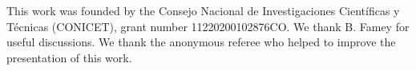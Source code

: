 \documentclass[twocolumn,twocolappendix,linenumbers]{aastex631}
\begin{document}
  










\begin{acknowledgments}
    This work was founded by the Consejo Nacional de Investigaciones Científicas y Técnicas (CONICET), grant number 11220200102876CO. We thank B. Famey for useful discussions. We thank the anonymous referee who helped to improve the presentation of this work.
\end{acknowledgments}

\appendix






\end{document}
